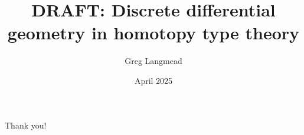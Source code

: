\documentclass[13pt,aspectratio=169]{beamer}
\title[Geometry in HoTT]{DRAFT: Discrete differential geometry in homotopy type theory}
\author{Greg Langmead}
\institute[CMU]{Carnegie Mellon University}
\date{April 2025}
\begin{document}
\begin{frame}
\titlepage
\end{frame}









\begin{frame}
\begin{center}
\alert{\huge{Thank you!}}
\end{center}
\end{frame}
\end{document}

